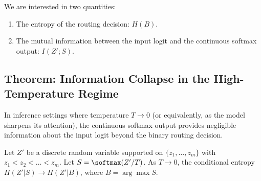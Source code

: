 We are interested in two quantities:






\begin{enumerate}






    \item The entropy of the routing decision: $H(B)$.






    \item The mutual information between the input logit and the continuous softmax output: $I(Z'; S)$.






\end{enumerate}













\subsection{Theorem: Information Collapse in the High-Temperature Regime}






In inference settings where temperature $T \to 0$ (or equivalently, as the model sharpens its attention), the continuous softmax output provides negligible information about the input logit beyond the binary routing decision.













\begin{theorem}






\label{thm:info_collapse}






Let $Z'$ be a discrete random variable supported on $\{z_1, \dots, z_m\}$ with $z_1 < z_2 < \dots < z_m$. Let $S = \softmax(Z'/T)$. As $T \to 0$, the conditional entropy $H(Z' | S) \to H(Z' | B)$, where $B = \arg \max S$.






\end{theorem}













